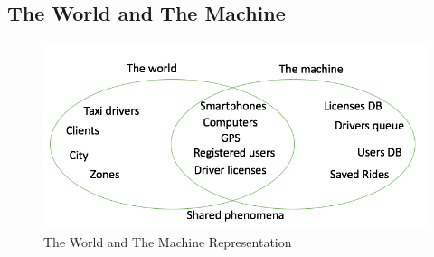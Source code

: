 \documentclass[a4paper]{article}
\begin{document}
\begin{enumerate}[label=\bfseries G\arabic*:]
\subsection{The World and The Machine}


\begin{figure}[H]
\includegraphics[width=.8\textwidth]{WorldAndMachine}
\centering
\caption{The World and The Machine Representation}
\end{figure}


\end{enumerate}
\end{document}
